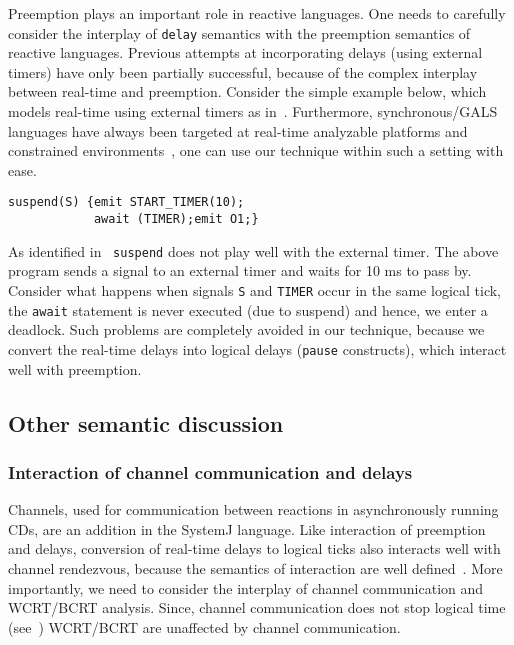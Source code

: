 Preemption plays an important role in reactive languages. One needs to
carefully consider the interplay of \texttt{delay} semantics with the
preemption semantics of reactive languages. Previous attempts at
incorporating delays (using external timers) have only been partially
successful, because of the complex interplay between real-time and
preemption. Consider the simple example below, which models real-time
using external timers as in~\cite{rsh94}. Furthermore, synchronous/GALS
languages have always been targeted at real-time analyzable platforms
and constrained
environments~\cite{DBLP:journals/pieee/SifakisTY03,boldt07}, one can use
our technique within such a setting with ease.

\begin{verbatim}
suspend(S) {emit START_TIMER(10); 
            await (TIMER);emit O1;}
\end{verbatim}

As identified in~\cite{Bourke2009a} \texttt{suspend} does not play well
with the external timer. The above program sends a signal to an external
timer and waits for 10 ms to pass by. Consider what happens when signals
\texttt{S} and \texttt{TIMER} occur in the same logical tick, the
\texttt{await} statement is never executed (due to suspend) and hence,
we enter a deadlock. Such problems are completely avoided in our
technique, because we convert the real-time delays into logical delays
(\texttt{pause} constructs), which interact well with preemption.

\subsection{Other semantic discussion}
\label{sec:other-semant-dissc}

\subsubsection{Interaction of channel communication and delays}
\label{sec:inter-chann-comm}

Channels, used for communication between reactions in asynchronously
running CDs, are an addition in the SystemJ language. Like interaction
of preemption and delays, conversion of real-time delays to logical
ticks also interacts well with channel rendezvous, because the semantics
of interaction are well defined~\cite{amal10}. More importantly, we need
to consider the interplay of channel communication and WCRT/BCRT
analysis. Since, channel communication does not stop logical time
(see~\cite{amal10}) WCRT/BCRT are unaffected by channel
communication. %


